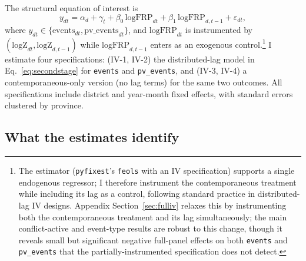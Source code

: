 \documentclass[12pt]{article}
\begin{document}
The structural equation of interest is
\begin{equation}
y_{dt} = \alpha_d + \gamma_t + \beta_0\, \text{logFRP}_{dt} + \beta_1\, \text{logFRP}_{d,t-1} + \varepsilon_{dt},
\label{eq:secondstage}
\end{equation}
where $y_{dt} \in \{\text{events}_{dt}, \text{pv\_events}_{dt}\}$, and $\text{logFRP}_{dt}$ is instrumented by $(\text{logZ}_{dt}, \text{logZ}_{d,t-1})$ while $\text{logFRP}_{d,t-1}$ enters as an exogenous control.\footnote{The estimator (\texttt{pyfixest}'s \texttt{feols} with an IV specification) supports a single endogenous regressor; I therefore instrument the contemporaneous treatment while including its lag as a control, following standard practice in distributed-lag IV designs. Appendix Section~\ref{sec:fulliv} relaxes this by instrumenting both the contemporaneous treatment and its lag simultaneously; the main conflict-active and event-type results are robust to this change, though it reveals small but significant negative full-panel effects on both \texttt{events} and \texttt{pv\_events} that the partially-instrumented specification does not detect.} I estimate four specifications: (IV-1, IV-2) the distributed-lag model in Eq.~\eqref{eq:secondstage} for \texttt{events} and \texttt{pv\_events}, and (IV-3, IV-4) a contemporaneous-only version (no lag terms) for the same two outcomes. All specifications include district and year-month fixed effects, with standard errors clustered by province.

\subsection{What the estimates identify}
\label{sec:estimand}
\end{document}
